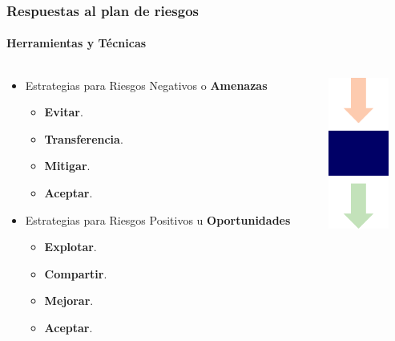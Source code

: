 \frame
{
\frametitle{Respuestas al plan de riesgos}
\framesubtitle{Herramientas y Técnicas}

\begin{columns}
	\begin{column}{0.8\textwidth}
		\begin{itemize}
			\item <1-> Estrategias para Riesgos Negativos o \textbf{Amenazas}
				\begin{itemize}
					\item <2-> \textbf{Evitar}.
					\item <3-> \textbf{Transferencia}.
					\item <4-> \textbf{Mitigar}.
					\item <5-> \textbf{Aceptar}.
				\end{itemize}
			\item <6-> Estrategias para Riesgos Positivos u \textbf{Oportunidades}
				\begin{itemize}
					\item <7-> \textbf{Explotar}.
					\item <8-> \textbf{Compartir}.
					\item <9-> \textbf{Mejorar}.
					\item <10-> \textbf{Aceptar}.
				\end{itemize}
		\end{itemize}
	\end{column}
	\begin{column}{0.2\textwidth}
		\includegraphics[width=2cm]{img/tools}
	\end{column}
\end{columns}
}

